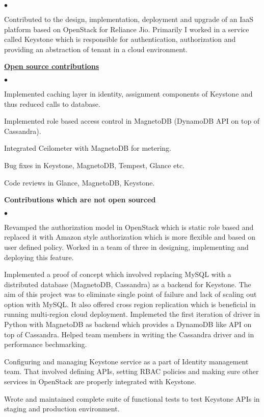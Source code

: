 \documentclass[11pt]{article}
\begin{document}
{\small

\noindent
\begin{list}{$\bullet$}{
}
\item Contributed to the design, implementation, deployment and upgrade of an IaaS platform based on OpenStack for Reliance Jio. Primarily I worked in a service called Keystone which is responsible for authentication, authorization and providing an abstraction of tenant in a cloud environment.

\item \href{http://stackalytics.com/?release=all&user_id=ajayaa}{\textbf{Open source contributions}}
\begin{list}{$\bullet$}{
}
\item Implemented caching layer in identity, assignment components of Keystone and thus reduced calls to database.
\item Implemented role based access control in MagnetoDB (DynamoDB API on top of Cassandra).
\item Integrated Ceilometer with MagnetoDB for metering.
\item Bug fixes in Keystone, MagnetoDB, Tempest, Glance etc.
\item Code reviews in Glance, MagnetoDB, Keystone.
\end{list}
\item {\textbf{Contributions which are not open sourced}}
\begin{list}{$\bullet$}{
}
\item  Revamped the authorization model in OpenStack which is static role based and replaced it with Amazon style authorization which is more flexible and based on user defined policy. Worked in a team of three in designing, implementing and deploying this feature.

\item Implemented a proof of concept which involved replacing MySQL with a distributed database (MagnetoDB, Cassandra) as a backend for Keystone. The aim of this project was to eliminate single point of failure and lack of scaling out option with MySQL. It also offered cross region replication which is beneficial in running multi-region cloud deployment. Implemeted the first iteration of driver in Python with MagnetoDB as backend which provides a DynamoDB like API on top of Cassandra. Helped team members in writing the Cassandra driver and in performance bechmarking.

\item Configuring and managing Keystone service as a part of Identity management team. That involved defining APIs, setting RBAC policies and making sure other services in OpenStack are properly integrated with Keystone.

\item Wrote and maintained complete suite of functional tests to test Keystone APIs in staging and production environment.

\end{list}
\end{list}
}
\end{document}
